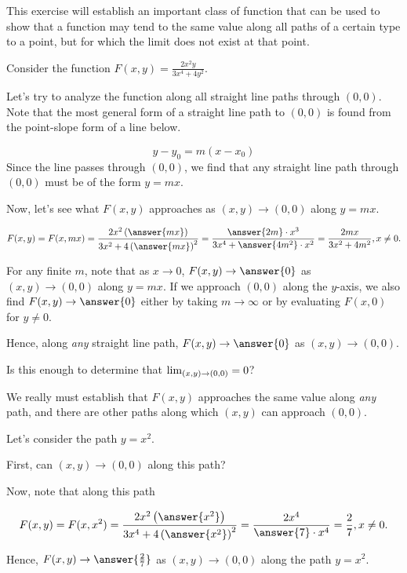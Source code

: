 \documentclass{ximera}
\author{Jim Talamo}
\begin{document}
\begin{exercise}
This exercise will establish an important class of function that can be used to show that a function may tend to the same value along all paths of a certain type to a point, but for which the limit does not exist at that point.

Consider the function $F(x,y) = \frac{2x^2y}{3x^4+4y^2}$.

Let's try to analyze the function along all straight line paths through $(0,0)$.  Note that the most general form of a straight line path to $(0,0)$ is found from the point-slope form of a line below.

\[
y-y_0=m(x-x_0)
\] 
Since the line passes through $(0,0)$, we find that any straight line path through $(0,0)$ must be of the form $y=mx$.

Now, let's see what $F(x,y)$ approaches as $(x,y) \to (0,0)$ along $y=mx$.

\[F(x,y) = F(x,mx) = \frac{2x^2\left(\answer{mx}\right)}{3x^2+4\left(\answer{mx}\right)^2} = \frac{\answer{2m} \cdot x^3 }{3x^4 + \answer{4m^2}\cdot x^2} = \frac{2mx}{3x^2+4m^2}, x \neq 0.
\]
 
 For any finite $m$, note that as $x \to 0$, $F(x,y) \to \answer{0}$ as $(x,y) \to (0,0)$ along $y=mx$.  If we approach $(0,0)$ along the $y$-axis, we also find $F(x,y) \to \answer{0}$ either by taking $m \to \infty$ or by evaluating $F(x,0)$ for $y \neq 0$.
 
 Hence, along \emph{any} straight line path, $F(x,y) \to \answer{0}$ as $(x,y) \to (0,0)$.
 
 Is this enough to determine that $\lim_{\left(x,y\right) \to \left(0,0\right)} = 0$? 
 
 \begin{exercise}
We really must establish that $F(x,y)$ approaches the same value along \emph{any} path, and there are other paths along which $(x,y)$ can approach $(0,0)$.

Let's consider the path $y=x^2$.  

First, can $(x,y) \to (0,0)$ along this path?  

Now, note that along this path

\[
F(x,y) = F(x,x^2) = \frac{2x^2\left(\answer{x^2}\right)}{3x^4+4\left(\answer{x^2}\right)^2} = \frac{2x^4}{\answer{7} \cdot x^4} = \frac{2}{7} , x \neq 0.
\]

 Hence, $F(x,y) \to \answer{\frac{2}{7}}$ as $(x,y) \to (0,0)$ along the path $y=x^2$.


\end{exercise}
\end{exercise}
\end{document}
